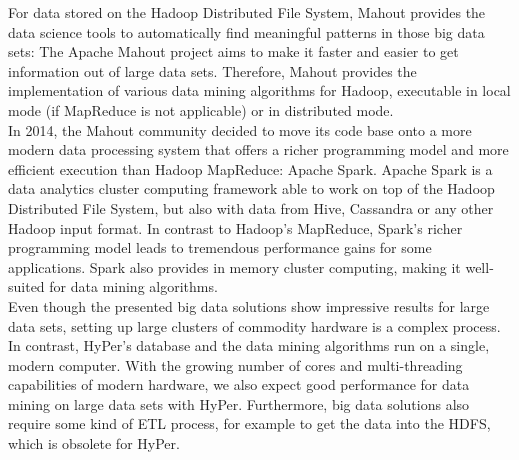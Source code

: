 For data stored on the Hadoop Distributed File System, Mahout provides the data science tools to automatically find meaningful patterns in those big data sets: The Apache Mahout project aims to make it faster and easier to get information out of large data sets.
Therefore, Mahout provides the implementation of various data mining algorithms for Hadoop, executable in local mode (if MapReduce is not applicable) or in distributed mode. 
\\
In 2014, the Mahout community decided to move its code base onto a more modern data processing system that offers a richer programming model and more efficient execution than Hadoop MapReduce: Apache Spark. Apache Spark is a data analytics cluster computing framework able to work on top of the Hadoop Distributed File System, but also with data from Hive, Cassandra or any other Hadoop input format. In contrast to Hadoop’s MapReduce, Spark's richer programming model leads to tremendous performance gains for some applications. Spark also provides in memory cluster computing, making it well-suited for data mining algorithms. 
\\
Even though the presented big data solutions show impressive results for large data sets, setting up large clusters of commodity hardware is a complex process. In contrast, HyPer's database and the data mining algorithms run on a single, modern computer. With the growing number of cores and multi-threading capabilities of modern hardware, we also expect good performance for data mining on large data sets with HyPer. Furthermore, big data solutions also require some kind of ETL process, for example to get the data into the HDFS, which is obsolete for HyPer.




